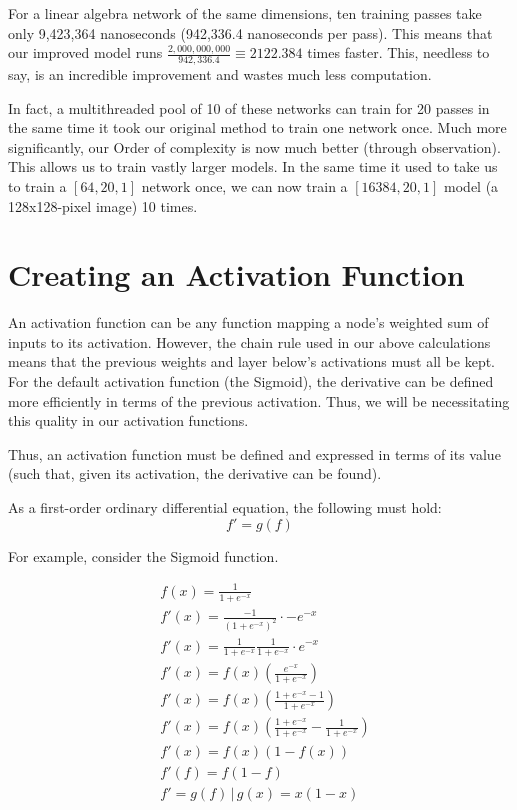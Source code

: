 \documentclass[8pt]{amsart}
\newcommand\where{\, \bigg\rvert \,}
\begin{document}
For a linear algebra network of the same dimensions, ten training passes take only
9,423,364 nanoseconds (942,336.4 nanoseconds per pass). This means that our improved
model runs $\frac{2,000,000,000}{942,336.4} \equiv 2122.384$ times faster. This, needless
to say, is an incredible improvement and wastes much less computation.

In fact, a multithreaded pool of 10 of these networks can train for 20 passes in the
same time it took our original method to train one network once. Much more significantly,
our Order of complexity is now much better (through observation). This allows us to
train vastly larger models. In the same time it used to take us to train a $[64, 20, 1]$
network once, we can now train a $[16384, 20, 1]$ model (a 128x128-pixel image) 10 times.

\section{Creating an Activation Function}

An activation function can be any function mapping
a node's weighted sum of inputs to its activation. However, the chain rule used
in our above calculations means that the previous weights and layer below's activations
must all be kept. For the default activation function (the Sigmoid), the derivative can
be defined more efficiently in terms of the previous activation. Thus, we will be
necessitating this quality in our activation functions.

Thus, an activation function must be defined and expressed in terms of its value (such
that, given its activation, the derivative can be found).

As a first-order ordinary differential equation, the following must hold:
\[
    f' = g(f)
\]

For example, consider the Sigmoid function.

\[
    \begin{aligned}
        & f(x) = \frac{1}{1 + e^{-x}} \\
        & f'(x) = \frac{-1}{(1 + e^{-x})^2} \cdot -e^{-x} \\
        & f'(x) = \frac{1}{1 + e^{-x}} \frac{1}{1 + e^{-x}} \cdot e^{-x} \\
        & f'(x) = f(x) \left( \frac{e^{-x}}{1 + e^{-x}} \right) \\
        & f'(x) = f(x) \left( \frac{1 + e^{-x} - 1}{1 + e^{-x}} \right) \\
        & f'(x) = f(x) \left( \frac{1 + e^{-x}}{1 + e^{-x}} - \frac{1}{1 + e^{-x}} \right) \\
        & f'(x) = f(x) (1 - f(x)) \\
        & f'(f) = f (1 - f) \\
        & f' = g(f) \where g(x) = x (1 - x) \\
    \end{aligned}
\]
\end{document}
